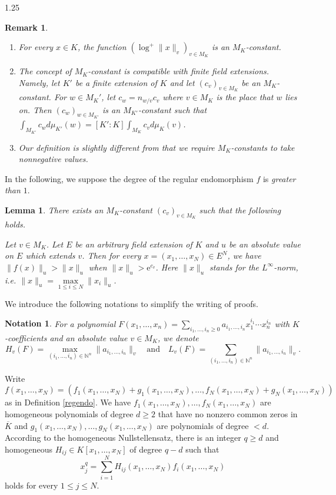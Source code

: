 \documentclass[12pt]{article}
\newtheorem{lemma}[definition]{Lemma}
\newtheorem{remark}[definition]{Remark}
\newtheorem{notation}[definition]{Notation}
\begin{document}
\begin{spacing}{1.25}
\begin{remark}
\begin{enumerate}
\item
For every $x\in K$, the function $(\log^+\|x\|_v)_{v\in M_K}$ is an $M_K$-constant.

\item
The concept of $M_K$-constant is compatible with finite field extensions. Namely, let $K'$ be a finite extension of $K$ and let $(c_v)_{v\in M_K}$ be an $M_K$-constant. For $w\in M_K'$, let $c_w=n_{w/v}c_v$ where $v\in M_K$ is the place that $w$ lies on. Then $(c_w)_{w\in M_{K'}}$ is an $M_{K'}$-constant such that $\int_{M_{K'}}c_wd\mu_{K'}(w)=[K':K]\int_{M_K}c_vd\mu_K(v)$.

\item
Our definition is slightly different from \cite[Definition 3.18]{Voj21} that we require $M_K$-constants to take nonnegative values.
\end{enumerate}
\end{remark}

In the following, we suppose the degree of the regular endomorphism $f$ is \emph{greater than $1$}.

\begin{lemma}\label{explem}
There exists an $M_K$-constant $(c_v)_{v\in M_K}$ such that the following holds.

Let $v\in M_K$. Let $E$ be an arbitrary field extension of $K$ and $u$ be an absolute value on $E$ which extends $v$. Then for every $x=(x_1,\dots,x_N)\in E^N$, we have $\|f(x)\|_u>\|x\|_u$ when $\|x\|_u>\mathrm{e}^{c_v}$. Here $\|x\|_u$ stands for the $L^{\infty}$-norm, i.e. $\|x\|_u=\max\limits_{1\leq i\leq N}\|x_i\|_u$.
\end{lemma}

We introduce the following notations to simplify the writing of proofs.

\begin{notation}\label{notation}
For a polynomial $F(x_1,\dots,x_n)=\sum\limits_{i_1,\dots,i_n\geq0}a_{i_1,\dots,i_n}x_1^{i_1}\cdots x_n^{i_n}$ with $K$-coefficients and an absolute value $v\in M_K$, we denote
$$
H_v(F)=\max\limits_{(i_1,\dots,i_n)\in\mathbb{N}^n}\|a_{i_1,\dots,i_n}\|_v\quad\text{and}\quad L_v(F)=\sum\limits_{(i_1,\dots,i_n)\in\mathbb{N}^n}\|a_{i_1,\dots,i_n}\|_v.
$$
\end{notation}

Write 
$$
f(x_1,\dots,x_N)=(f_1(x_1,\dots,x_N)+g_1(x_1,\dots,x_N),\dots,f_N(x_1,\dots,x_N)+g_N(x_1,\dots,x_N))
$$
as in Definition \ref{regendo}. We have $f_1(x_1,\dots,x_N),\dots,f_N(x_1,\dots,x_N)$ are homogeneous polynomials of degree $d\geq2$ that have no nonzero common zeros in $\overline{K}$ and $g_1(x_1,\dots,x_N),\dots,g_N(x_1,\dots,x_N)$ are polynomials of degree $<d$. According to the homogeneous Nullstellensatz, there is an integer $q\geq d$ and homogeneous $H_{ij}\in K[x_1,\dots,x_N]$ of degree $q-d$ such that
$$
x_j^q=\sum\limits_{i=1}^{N}H_{ij}(x_1,\dots,x_N)f_i(x_1,\dots,x_N)
$$
holds for every $1\leq j\leq N$.


\end{spacing}
\end{document}
